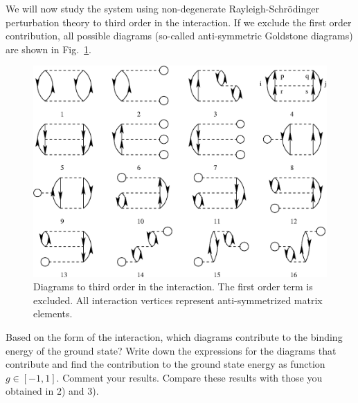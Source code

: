 \documentclass[prc]{revtex4} \usepackage[dvips]{graphicx}
\begin{document}
\begin{enumerate}
We will now study the system using non-degenerate
Rayleigh-Schr\"odinger perturbation theory to third order in the
interaction.  If we exclude the first order contribution, all possible
diagrams (so-called anti-symmetric Goldstone diagrams) are
shown in Fig.~\ref{fig:diagrams}.
\begin{figure}[hbtp]
\includegraphics[width=.6\textwidth]{figures/diagrams.eps}
\caption{Diagrams to third order in the interaction. The first order
  term is excluded. All interaction vertices represent anti-symmetrized matrix elements.\label{fig:diagrams}}
\end{figure}

Based on the form of the interaction, which diagrams contribute to the
binding energy of the ground state?  Write down the expressions for
the diagrams that contribute and find the contribution to the ground
state energy as function $g\in [-1,1]$. Comment your results.  Compare
these results with those you obtained in 2) and 3).



\end{enumerate}
\end{document}
